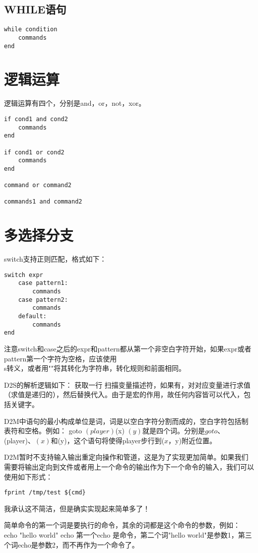 \subsection{WHILE语句}
\begin{lstlisting}
while condition
    commands
end
\end{lstlisting}

\section{逻辑运算}
逻辑运算有四个，分别是and，or，not，xor。
\begin{lstlisting}
if cond1 and cond2
    commands
end

if cond1 or cond2
    commands
end

command or command2

commands1 and command2
\end{lstlisting}


\section{多选择分支}
switch支持正则匹配，格式如下：
\begin{lstlisting}
switch expr
    case pattern1:
        commands
    case pattern2:
        commands
    default:
        commands
end
\end{lstlisting}
注意switch和case之后的expr和pattern都从第一个非空白字符开始，如果expr或者pattern第一个字符为空格，应该使用\\s转义，或者用""将其转化为字符串，转化规则和前面相同。

D2S的解析逻辑如下：
获取一行
扫描变量描述符，如果有，对对应变量进行求值（求值是递归的），然后替换代入。由于是宏的作用，故任何内容皆可以代入，包括关键字。


D2M中语句的最小构成单位是词，词是以空白字符分割而成的，空白字符包括制表符和空格。例如：
goto $(player) $(x) $(y)
就是四个词。分别是goto、$(player)、$(x)和$(y)，这个语句将使得player步行到($x，$y)附近位置。

D2M暂时不支持输入输出重定向操作和管道，这是为了实现更加简单。如果我们需要将输出定向到文件或者用上一个命令的输出作为下一个命令的输入，我们可以使用如下形式：
\begin{lstlisting}
fprint /tmp/test ${cmd}
\end{lstlisting}
我承认这不简洁，但是确实实现起来简单多了！

简单命令的第一个词是要执行的命令，其余的词都是这个命令的参数，例如： 
echo "hello world" echo 
第一个echo 是命令，第二个词"hello world"是参数1，第三个词echo是参数2，而不再作为一个命令了。

